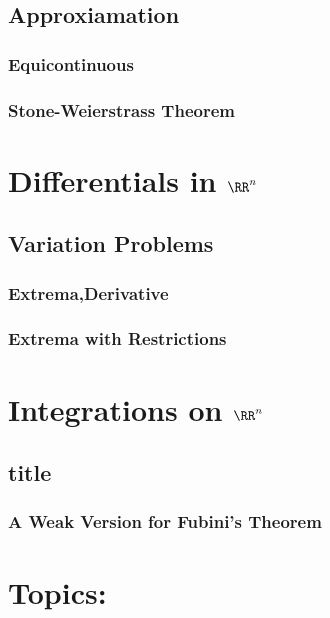 \documentclass[Total.tex]{subfiles}
\begin{document}
		\section{Approxiamation}
			\subsection{Equicontinuous}
			\subsection{Stone-Weierstrass Theorem}
	\chapter{Differentials in $\RR^n$}
		\section{Variation Problems}	
			\subsection{Extrema,Derivative}
				
			\subsection{Extrema with Restrictions}
				
	\chapter{Integrations on $\RR^n$}
		\section{title}
			\subsection{A Weak Version for Fubini's Theorem}
	\chapter{Topics:}
\end{document}
